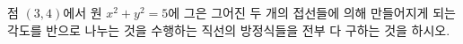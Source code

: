 점 $(3, 4)$에서 원 $x^2 + y^2 = 5$에 그은 그어진 두 개의 접선들에 의해 만들어지게 되는 각도를 반으로 나누는 것을 수행하는 직선의 방정식들을 전부 다 구하는 것을 하시오.
